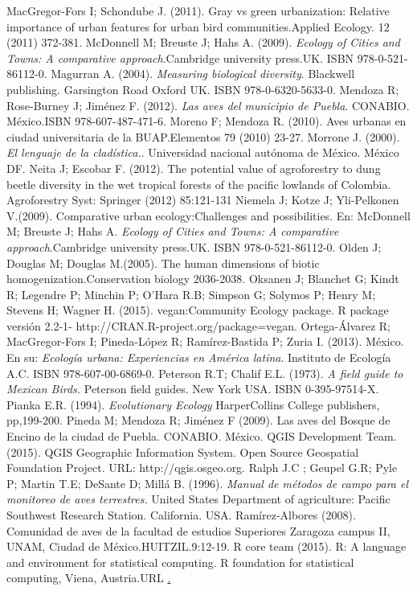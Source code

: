 \documentclass[letterpaper,12pt]{article}
\begin{document}
\begin{thebibliography}{37}
MacGregor-Fors I; Schondube J. (2011). Gray vs green urbanization: Relative importance of urban features for urban bird communities.Applied Ecology. 12 (2011) 372-381.   
McDonnell M; Breuste J; Hahs A. (2009). \textit{Ecology of Cities and Towns: A comparative approach}.Cambridge university press.UK. ISBN 978-0-521-86112-0.   
Magurran A. (2004). \textit{ Measuring biological diversity}. Blackwell publishing. Garsington Road Oxford UK. ISBN 978-0-6320-5633-0. 
Mendoza R; Rose-Burney J; Jiménez F. (2012). \textit{Las aves del municipio de Puebla}. CONABIO. México.ISBN 978-607-487-471-6.
Moreno F; Mendoza R. (2010). Aves urbanas en ciudad universitaria de la BUAP.Elementos 79 (2010) 23-27.
Morrone J. (2000). \textit{El lenguaje de la cladística.}. Universidad nacional autónoma de México. México DF.
Neita J; Escobar F. (2012). The potential value of agroforestry to dung beetle diversity in the wet tropical forests of the pacific lowlands of Colombia. Agroforestry Syst: Springer (2012) 85:121-131 
Niemela J; Kotze J; Yli-Pelkonen V.(2009). Comparative urban ecology:Challenges and possibilities. En: McDonnell M; Breuste J; Hahs A. \textit{Ecology of Cities and Towns: A comparative approach}.Cambridge university press.UK. ISBN 978-0-521-86112-0.   
\bibitem{}Olden J; Douglas M;  Douglas M.(2005). The human dimensions of biotic homogenization.Conservation biology 2036-2038. 
Oksanen J; Blanchet G; Kindt R; Legendre P; Minchin P; O'Hara R.B; Simpson G; Solymos P; Henry M; Stevens H; Wagner H. (2015). vegan:Community Ecology package. R package versión 2.2-1- http://CRAN.R-project.org/package=vegan.
\bibitem{}Ortega-Álvarez R; MacGregor-Fors I; Pineda-López R; Ramírez-Bastida P; Zuria I. (2013). México. En su: \textit{Ecología urbana: Experiencias en América latina}. Instituto de Ecología A.C. ISBN 978-607-00-6869-0.
Peterson R.T; Chalif E.L. (1973). \textit{A field guide to Mexican Birds.} Peterson field guides. New York USA. ISBN 0-395-97514-X.
Pianka E.R. (1994). \textit{Evolutionary Ecology} HarperCollins College publishers, pp,199-200.
Pineda M; Mendoza R; Jiménez F (2009). Las aves del Bosque de Encino de la ciudad de Puebla. CONABIO. México.
\bibitem{} QGIS Development Team. (2015). QGIS Geographic Information System. Open Source Geospatial Foundation Project. URL: http://qgis.osgeo.org.
Ralph J.C ; Geupel G.R; Pyle P; Martin T.E; DeSante D; Millá B. (1996). \textit{Manual de métodos de campo para el monitoreo de aves terrestres.} United States Department of agriculture: Pacific Southwest Research Station. California. USA.
Ramírez-Albores (2008). Comunidad de aves de la facultad de estudios Superiores Zaragoza campus II, UNAM, Ciudad de México.HUITZIL.9:12-19.
R core team (2015). R: A language and environment for statistical computing. R foundation for statistical computing, Viena, Austria.URL \href{http://R-project.org/}. 


\end{thebibliography}
\end{document}

